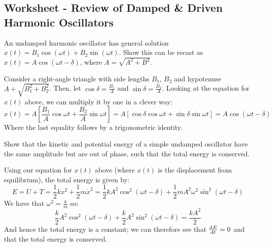 \subsection{Worksheet - Review of Damped \& Driven Harmonic Oscillators}
\begin{p}
An undamped harmonic oscillator has general solution $x(t) = B_1\cos(\omega t) + B_2\sin(\omega t)$. Show this can be recast as $x(t) = A\cos(\omega t - \delta)$, where $A = \sqrt{A^2 + B^2}$.
\end{p}
\begin{s}
Consider a right-angle triangle with side lengths $B_1$, $B_2$ and hypotenuse $A + \sqrt{B_1^2 + B_2^2}$. Then, let $\cos\delta = \frac{B_1}{A}$ and $\sin\delta = \frac{B_2}{A}$. Looking at the equation for $x(t)$ above, we can multiply it by one in a clever way:
\[x(t) = A\left[\frac{B_1}{A}\cos\omega t + \frac{B_2}{A}\sin\omega t\right] = A\left[\cos\delta\cos\omega t + \sin\delta \sin\omega t\right] = A\cos(\omega t - \delta)\]
Where the last equality follows by a trigonometric identity.
\end{s}

\begin{p}
Show that the kinetic and potential energy of a simple undamped oscillator have the same amplitude but are out of phase, such that the total energy is conserved. 
\end{p}
\begin{s}
Using our equation for $x(t)$ above (where $x(t)$ is the displacement from equilibrium), the total energy is given by:
\[E = U + T = \frac{1}{2}kx^2 + \frac{1}{2}m\dot{x}^2 = \frac{1}{2}kA^2\cos^2(\omega t - \delta) + \frac{1}{2}mA^2\omega^2\sin^2(\omega t - \delta)\]
We have that $\omega^2 = \frac{k}{m}$ so:
\[\frac{k}{2}A^2\cos^2(\omega t - \delta) + \frac{k}{2}A^2\sin^2(\omega t - \delta) = \frac{kA^2}{2}\]
And hence the total energy is a constant; we can therefore see that $\od{E}{t} = 0$ and that the total energy is conserved.
\end{s}

